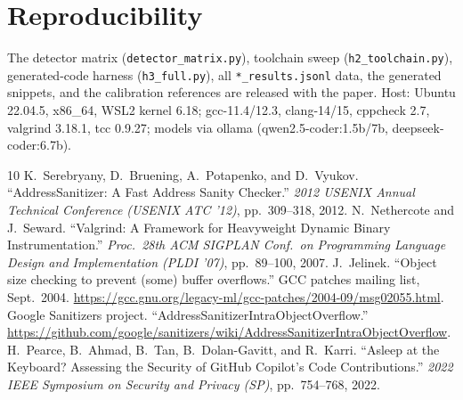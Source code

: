 \documentclass[11pt]{article}
\begin{document}
\section*{Reproducibility}
The detector matrix (\texttt{detector\_matrix.py}), toolchain sweep (\texttt{h2\_toolchain.py}),
generated-code harness (\texttt{h3\_full.py}), all \texttt{*\_results.jsonl} data, the generated
snippets, and the calibration references are released with the paper. Host: Ubuntu 22.04.5,
x86\_64, WSL2 kernel 6.18; gcc-11.4/12.3, clang-14/15, cppcheck 2.7, valgrind 3.18.1, tcc
0.9.27; models via ollama (qwen2.5-coder:1.5b/7b, deepseek-coder:6.7b).

\begin{thebibliography}{10}
 K.~Serebryany, D.~Bruening, A.~Potapenko, and D.~Vyukov.
  ``AddressSanitizer: A Fast Address Sanity Checker.''
  \emph{2012 USENIX Annual Technical Conference (USENIX ATC '12)}, pp.~309--318, 2012.
 N.~Nethercote and J.~Seward.
  ``Valgrind: A Framework for Heavyweight Dynamic Binary Instrumentation.''
  \emph{Proc.\ 28th ACM SIGPLAN Conf.\ on Programming Language Design and Implementation
  (PLDI '07)}, pp.~89--100, 2007.
 J.~Jelinek.
  ``Object size checking to prevent (some) buffer overflows.''
  GCC patches mailing list, Sept.\ 2004.
  \url{https://gcc.gnu.org/legacy-ml/gcc-patches/2004-09/msg02055.html}.
 Google Sanitizers project.
  ``AddressSanitizerIntraObjectOverflow.''
  \url{https://github.com/google/sanitizers/wiki/AddressSanitizerIntraObjectOverflow}.
 H.~Pearce, B.~Ahmad, B.~Tan, B.~Dolan-Gavitt, and R.~Karri.
  ``Asleep at the Keyboard? Assessing the Security of GitHub Copilot's Code Contributions.''
  \emph{2022 IEEE Symposium on Security and Privacy (SP)}, pp.~754--768, 2022.
\end{thebibliography}
\end{document}
